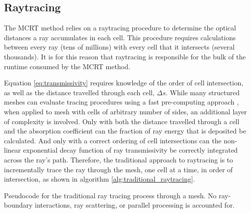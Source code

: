 \subsection{Raytracing}
The MCRT method relies on a raytracing procedure to determine the optical distances a ray accumulates in each cell. This procedure requires calculations between every ray (tens of millions) with every cell that it intersects (several thousands). 
It is for this reason that raytracing is responsible for the bulk of the runtime consumed by the MCRT method.

Equation \ref{eq:transmissivity} requires knowledge of the order of cell intersection, as well as the distance travelled through each cell, $\Delta{}s$. While many structured meshes can evaluate tracing procedures using a fast pre-computing approach \cite{Amanatides1987ATracing}, when applied to mesh with cells of arbitrary number of sides, an additional layer of complexity is involved.
Only with both the distance travelled through a cell and the absorption coefficient can the fraction of ray energy that is deposited be calculated.
And only with a correct ordering of cell intersections can the non-linear exponential decay function of ray transmissivity be correctly integrated across the ray's path.
Therefore, the traditional approach to raytracing is to incrementally trace the ray through the mesh, one cell at a time, in order of intersection, as shown in algorithm  \ref{alg:traditional_raytracing}.

\begin{algorithm}[hbt!]
\caption{Pseudocode for the traditional ray tracing process through a mesh. No ray-boundary interactions, ray scattering, or parallel processing is accounted for.}\label{alg:traditional_raytracing}
\end{algorithm}

